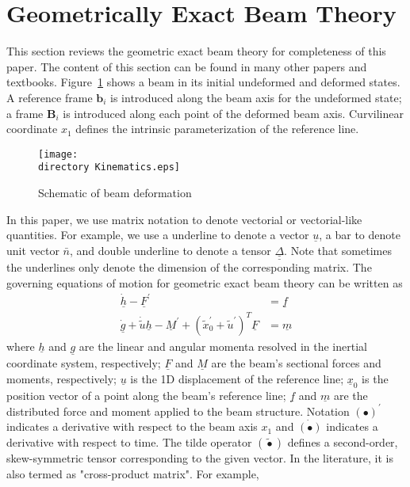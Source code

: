 \documentclass{aiaa-tc}
\def\directory{EPSF/}
\renewcommand{\vec}[1]{\underline{#1}}
\renewcommand{\skew}[1]{\widetilde{#1}}
\begin{document}
\section{Geometrically Exact Beam Theory}
This section reviews the geometric exact beam theory for completeness of this paper. The content of this section can be found in many other papers and textbooks.
Figure~\ref{Kinematics} shows a beam in its initial undeformed
and deformed states. A reference frame $\mathbf{b}_i$ is introduced along the
beam axis for the undeformed state; a frame $\mathbf{B}_i$ is introduced
along each point of the deformed beam axis. Curvilinear coordinate $x_1$ defines the intrinsic parameterization of the reference line.
\begin{figure}
\centering
\texttt{[image: \\directory Kinematics.eps]}
\caption{Schematic of beam deformation} \label{Kinematics}
\end{figure}
In this paper, we use matrix notation to denote vectorial or vectorial-like quantities. For example, we use a underline to denote a vector $\underline{u}$, a bar to denote unit vector $\bar{n}$, and double underline to denote a tensor $\underline{\underline{\Delta}}$. Note that sometimes the underlines only denote the dimension of the corresponding matrix. The governing equations of motion for geometric exact beam theory can be written as \cite{Bauchau:2010}
\begin{align}
	\label{GovernGEBT-1}
	\dot{\underline{h}} - \underline{F}^\prime &= \underline{f} \\
	\label{GovernGEBT-2}
	\dot{\underline{g}} + \dot{\tilde{u}} \underline{h} - \underline{M}^\prime + (\tilde{x}_0^\prime + \tilde{u}^\prime)^T \underline{F} &= \underline{m}
\end{align}
where $\vec{h}$ and $\vec{g}$ are the linear and angular momenta resolved in the inertial coordinate system, respectively; $\vec{F}$ and $\vec{M}$ are the beam's sectional forces and moments, respectively; $\vec{u}$ is the 1D displacement of the reference line; $\vec{x}_0$ is the position vector of a point along the beam's reference line; $\vec{f}$ and $\vec{m}$ are the distributed force and moment applied to the beam structure.  Notation $(\bullet)^\prime$ indicates a derivative with respect to the beam axis $x_1$ and $\dot{(\bullet)}$ indicates a derivative with respect to time. The tilde operator $(\skew{\bullet})$ defines a second-order, skew-symmetric tensor corresponding to the given vector. In the literature, it is also termed as "cross-product matrix". For example,
\end{document}
